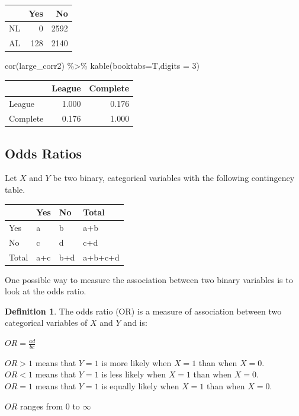 \documentclass[
  11pt,
]{book}
\newenvironment{Shaded}{\begin{snugshade}}{\end{snugshade}}
\newcommand{\AttributeTok}[1]{\textcolor[rgb]{0.77,0.63,0.00}{#1}}
\newcommand{\DecValTok}[1]{\textcolor[rgb]{0.00,0.00,0.81}{#1}}
\newcommand{\FunctionTok}[1]{\textcolor[rgb]{0.00,0.00,0.00}{#1}}
\newcommand{\NormalTok}[1]{#1}
\newcommand{\SpecialCharTok}[1]{\textcolor[rgb]{0.00,0.00,0.00}{#1}}
\theoremstyle{definition}
\newtheorem{definition}{Definition}[chapter]
\theoremstyle{definition}
\theoremstyle{definition}
\theoremstyle{definition}
\theoremstyle{remark}
\begin{document}
\begin{tabular}{lrr}
\toprule
  & Yes & No\\
\midrule
NL & 0 & 2592\\
AL & 128 & 2140\\
\bottomrule
\end{tabular}

\begin{Shaded}
\begin{Highlighting}[]
\FunctionTok{cor}\NormalTok{(large\_corr2) }\SpecialCharTok{\%\textgreater{}\%} \FunctionTok{kable}\NormalTok{(}\AttributeTok{booktabs=}\NormalTok{T,}\AttributeTok{digits =} \DecValTok{3}\NormalTok{)}
\end{Highlighting}
\end{Shaded}

\begin{tabular}{lrr}
\toprule
  & League & Complete\\
\midrule
League & 1.000 & 0.176\\
Complete & 0.176 & 1.000\\
\bottomrule
\end{tabular}

\newpage

\hypertarget{odds-ratios}{%
\subsection{Odds Ratios}\label{odds-ratios}}

Let \(X\) and \(Y\) be two binary, categorical variables with the following contingency table.

\begin{tabular}{llll}
\toprule
  & Yes & No & Total\\
\midrule
Yes & a & b & a+b\\
No & c & d & c+d\\
Total & a+c & b+d & a+b+c+d\\
\bottomrule
\end{tabular}

One possible way to measure the association between two binary variables is to look at the odds ratio.

\begin{definition}
The odds ratio (OR) is a measure of association between two categorical variables of \(X\) and \(Y\) and is:

\(OR = \frac{ad}{bc}\)

\(OR > 1\) means that \(Y=1\) is more likely when \(X=1\) than when \(X=0\).\\
\(OR < 1\) means that \(Y=1\) is less likely when \(X=1\) than when \(X=0\).\\
\(OR = 1\) means that \(Y=1\) is equally likely when \(X=1\) than when \(X=0\).

\(OR\) ranges from 0 to \(\infty\)
\end{definition}
\end{document}
